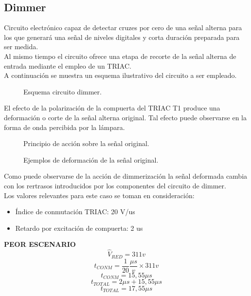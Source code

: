\documentclass[a4paper,11pt]{article}
\begin{document}
\subsection{Dimmer}
Circuito electrónico capaz de detectar cruzes por cero de una señal alterna para los que generará una señal de niveles digitales y corta duración preparada para ser medida.\\
Al mismo tiempo el circuito ofrece una etapa de recorte de la señal alterna de entrada mediante el empleo de un TRIAC.\\
A continuación se muestra un esquema ilustrativo del circuito a ser empleado.

\begin{figure}[H] %
	\caption{Esquema circuito dimmer.}
	\label{fig:circ_dimmer}
\end{figure} 
 
 El efecto de la polarización de la compuerta del TRIAC T1 produce una deformación o corte de la señal alterna original. Tal efecto puede observarse en la forma de onda percibida por la lámpara.
 
 \begin{figure}[H] %
 	\caption{Principio de acción sobre la señal original.}
 	\label{fig:gate_chopped}
 \end{figure} 
 
\begin{figure}[H] %
	\caption{Ejemplos de deformación de la señal original.}
	\label{fig:chopped_examples}
\end{figure} 
 
 Como puede observarse de la acción de dimmerización la señal deformada cambia con los rertrasos introducidos por los componentes del circuito de dimmer.\\
 Los valores relevantes para este caso se toman en consideración:

\begin{itemize}
	\item Índice de conmutación TRIAC: 20 V/us
	\item Retardo por excitación de compuerta: 2 us
\end{itemize}

\textbf{PEOR ESCENARIO}
$$\widehat{V}_{RED} = 311v$$
$$t_{CONM} = \frac{1}{20}\frac{\mu s}{v}\times 311v$$
$$t_{CONM} = 15,55\mu s$$
$$t_{TOTAL} = 2\mu s + 15,55\mu s$$
$$t_{TOTAL} = 17,55\mu s$$
\end{document}
